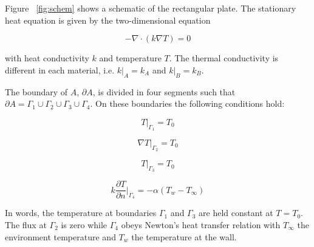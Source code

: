 \documentclass[10pt,a4paper]{article}
\begin{document}
Figure ~\ref{fig:schem} shows a schematic of the rectangular plate. The stationary heat equation is given by the two-dimensional equation 

\begin{equation}
	-\nabla \cdot (k \nabla T) = 0
\end{equation}

with heat conductivity $k$ and temperature $T$. The thermal conductivity is different in each material, i.e. $ k|_A = k_A $ and $k|_B = k_B $.

The boundary of $A$, $\partial A$,  is divided in four segments such that $\partial A = \Gamma_1 \cup  \Gamma_2 \cup  \Gamma_3 \cup  \Gamma_4$. On these boundaries the following conditions hold:

\begin{equation}
T|_{\Gamma_1} = T_0
\end{equation}

\begin{equation}
\nabla T|_{\Gamma_2} = T_0
\end{equation}

\begin{equation}
T|_{\Gamma_3} = T_0
\end{equation}

\begin{equation}
k\frac{\partial T}{\partial n}|_{\Gamma_4}=-\alpha(T_w - T_{\infty})
\end{equation}

In words, the temperature at boundaries $\Gamma_1$ and $\Gamma_3$ are held constant at $T=T_0$. The flux at $\Gamma_2$ is zero while $\Gamma_4$ obeys Newton's heat transfer relation with $T_{\infty}$ the environment temperature and $T_w$ the temperature at the wall.
\end{document}
